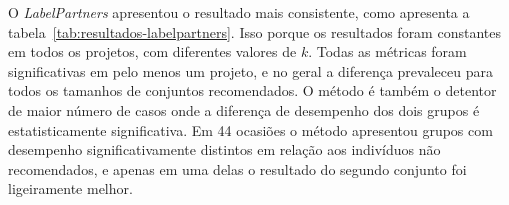 \documentclass[12pt,openany,oneside,a4paper,english,brazil]{abntbibufjf}
\begin{document}
O \textit{LabelPartners} apresentou o resultado mais consistente, como apresenta a tabela~\ref{tab:resultados-labelpartners}. Isso porque os resultados foram constantes em todos os projetos, com diferentes valores de $k$. Todas as métricas foram significativas em pelo menos um projeto, e no geral a diferença prevaleceu para todos os tamanhos de conjuntos recomendados. O método é também o detentor de maior número de casos onde a diferença de desempenho dos dois grupos é estatisticamente significativa. Em 44 ocasiões o método apresentou grupos com desempenho significativamente distintos em relação aos indivíduos não recomendados, e apenas em uma delas o resultado do segundo conjunto foi ligeiramente melhor.

\begin{table}[htbp]
\centering
{}
\end{table}
\end{document}
